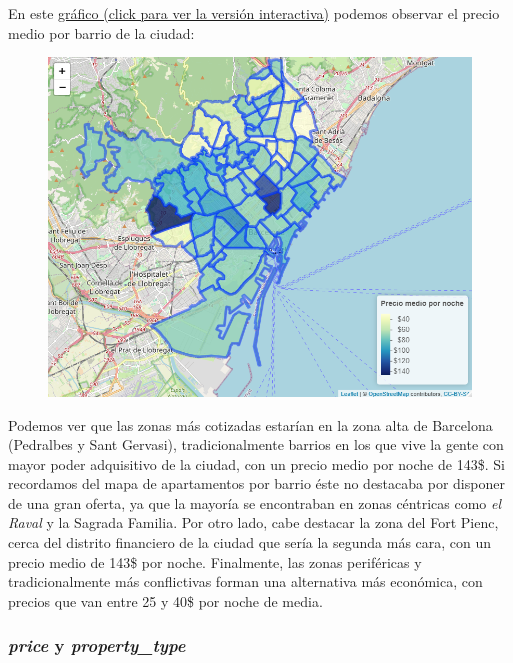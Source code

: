 \documentclass{article}
\begin{document}
En este \href{https://rpubs.com/marctotti5/754320}{gráfico (click para ver la versión interactiva)} podemos observar el precio medio por barrio de la ciudad:
\vspace{0.35cm}
\begin{figure}[h]
\hspace*{-0.15cm}
\centering
\includegraphics[scale = 0.6]{price_per_neighbourhood}
\end{figure}
\vspace{0.15cm}

Podemos ver que las zonas más cotizadas estarían en la zona alta de Barcelona (Pedralbes y Sant Gervasi), tradicionalmente barrios en los que vive la gente con mayor poder adquisitivo de la ciudad, con un precio medio por noche de 143\$. Si recordamos del mapa de apartamentos por barrio éste no destacaba por disponer de una gran oferta, ya que la mayoría se encontraban en zonas céntricas como \emph{el Raval} y la Sagrada Familia. Por otro lado, cabe destacar la zona del Fort Pienc, cerca del distrito financiero de la ciudad que sería la segunda más cara, con un precio medio de 143\$ por noche. Finalmente, las zonas periféricas y tradicionalmente más conflictivas forman una alternativa más económica, con precios que van entre 25 y 40\$ por noche de media.

\clearpage
\subsubsection{\emph{price} y \emph{property\_type}}
\end{document}
